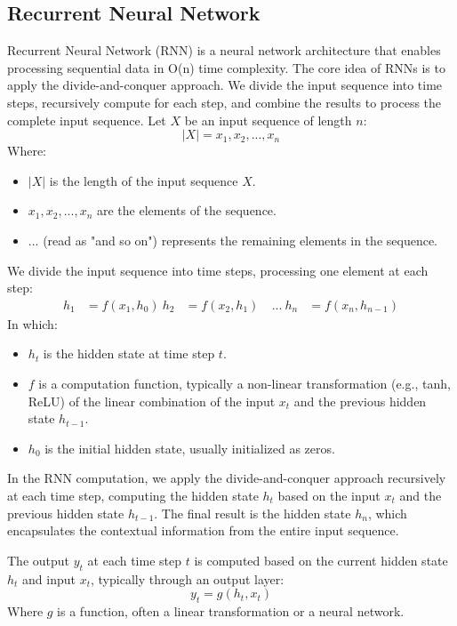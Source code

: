 \documentclass{ieeeojies}
\begin{document}
\subsection{Recurrent Neural Network}
Recurrent Neural Network (RNN) is a neural network architecture that enables processing sequential data in O(n) time complexity. The core idea of RNNs is to apply the divide-and-conquer approach. We divide the input sequence into time steps, recursively compute for each step, and combine the results to process the complete input sequence. 
Let $X$ be an input sequence of length $n$:
\begin{equation}
  |X| = x_1, x_2, ..., x_n
  \end{equation}
  Where:
  \begin{itemize}
  \item $|X|$ is the length of the input sequence $X$.
  \item $x_1, x_2, ..., x_n$ are the elements of the sequence.
  \item ... (read as "and so on") represents the remaining elements in the sequence.
  \end{itemize}
  We divide the input sequence into time steps, processing one element at each step:
  \begin{align}
  h_1 &= f(x_1, h_0) \
  h_2 &= f(x_2, h_1) \
  &...\
  h_n &= f(x_n, h_{n-1})
  \end{align}
  In which:
  \begin{itemize}
  \item $h_t$ is the hidden state at time step $t$.
  \item $f$ is a computation function, typically a non-linear transformation (e.g., tanh, ReLU) of the linear combination of the input $x_t$ and the previous hidden state $h_{t-1}$.
  \item $h_0$ is the initial hidden state, usually initialized as zeros.
  \end{itemize}

  In the RNN computation, we apply the divide-and-conquer approach recursively at each time step, computing the hidden state $h_t$ based on the input $x_t$ and the previous hidden state $h_{t-1}$. The final result is the hidden state $h_n$, which encapsulates the contextual information from the entire input sequence.

  The output $y_t$ at each time step $t$ is computed based on the current hidden state $h_t$ and input $x_t$, typically through an output layer:
  \begin{equation}
  y_t = g(h_t, x_t)
  \end{equation}
  Where $g$ is a function, often a linear transformation or a neural network.
\end{document}
